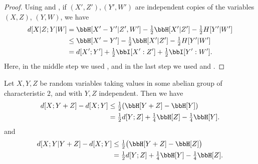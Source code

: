 \begin{proof}
\leanok
Using  and , if $(X',Z'), (Y',W')$ are independent copies of the variables $(X,Z)$, $(Y,W)$, we have
\begin{align*}
  d[X  | Z; Y | W]&= \bbH[X'-Y'|Z',W'] - \tfrac{1}{2} \bbH[X'|Z'] - \tfrac{1}{2}H[Y'|W'] \\
                       &\le \bbH[X'-Y']- \tfrac{1}{2} \bbH[X'|Z'] - \tfrac{1}{2}H[Y'|W'] \\
                       &= d[X';Y'] + \tfrac{1}{2}  \bbI[X' : Z'] + \tfrac{1}{2}  \bbI[Y' : W'].
\end{align*}
Here, in the middle step we used , and in the last step we used  and .
\end{proof}

\begin{lemma}\label{first-useful}
  \leanok
  Let $X, Y, Z$ be random variables taking values in some abelian group of characteristic $2$, and with $Y, Z$ independent. Then we have
  \begin{align}\nonumber d[X ; Y + Z] -d[X ; Y] &  \leq \tfrac{1}{2} (\bbH[Y+ Z] - \bbH[Y]) \\ & = \tfrac{1}{2} d[Y; Z] + \tfrac{1}{4} \bbH[Z] - \tfrac{1}{4} \bbH[Y]. \label{lem51-a} \end{align}
  and
  \begin{align}\nonumber
  d[X ;Y|Y+ Z] - d[X ;Y] & \leq \tfrac{1}{2} \bigl(\bbH[Y+ Z] - \bbH[Z]\bigr) \\ & = \tfrac{1}{2} d[Y;Z] + \tfrac{1}{4} \bbH[Y] - \tfrac{1}{4} \bbH[Z].
    \label{ruzsa-3}
  \end{align}
  \end{lemma}

